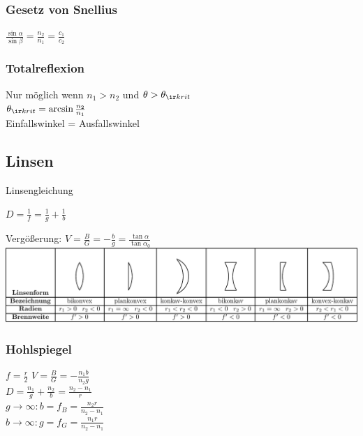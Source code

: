 \documentclass[german]{latex4ei/latex4ei_sheet}
\begin{document}
\subsubsection{Gesetz von Snellius}
$\frac{\sin \alpha}{\sin \beta} = \frac{n_2}{n_1} = \frac {c_1}{c_2}$
\subsubsection{Totalreflexion}
Nur möglich wenn $n_1 > n_2$ und $\theta > \theta_{\ir krit}$ \\
$\theta_{\ir krit} = \arcsin \frac{n_2}{n_1}$\\
Einfallswinkel = Ausfallswinkel


\subsection{Linsen}
Linsengleichung
\begin{emphbox}
$D=\frac{1}{f}=\frac{1}{g}+\frac{1}{b}$	
\end{emphbox}
Vergößerung: $V=\frac{B}{G}= - \frac{b}{g}=\frac{\tan \alpha}{\tan \alpha_0}$\\
\includegraphics[width=\columnwidth]{img/Linsen_crop.pdf}
\begin{sectionbox}
\subsubsection{Hohlspiegel}
$f=\frac{r}{2}$ \qquad $V=\frac{B}{G}= - \frac{n_1b}{n_2g}$ \\
$D=\frac{n_1}{g}+\frac{n_2}{b}=\frac{n_2-n_1}{r}$\\
$g\rightarrow \infty: b=f_B=\frac{n_2r}{n_2-n_1}$\\
$b\rightarrow \infty: g=f_G=\frac{n_1r}{n_2-n_1}$\\
\end{sectionbox}
\end{document}
